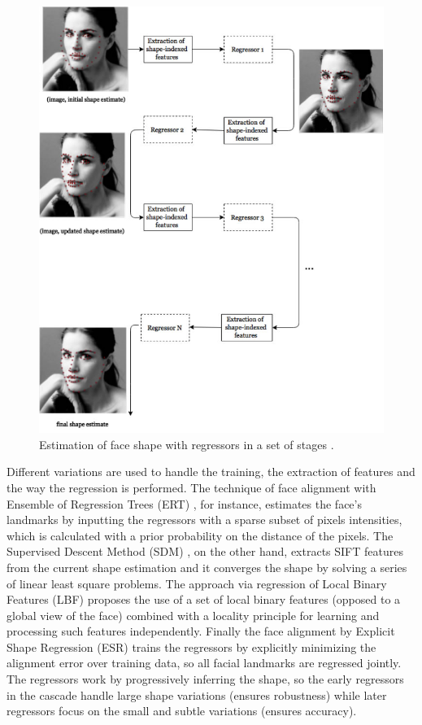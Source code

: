 \begin{figure}[ht]
    \centering
    \includegraphics[width=0.9\linewidth]{figures/cascade-explanation.jpg}
    \caption{Estimation of face shape with regressors in a set of stages \parencite{maris2015}.}
    \label{fig:regressor-steps}
\end{figure}

Different variations are used to handle the training, the extraction of features and the way the regression is performed. The technique of face alignment with Ensemble of Regression Trees (ERT) \parencite{kazemi2014one}, for instance, estimates the face's landmarks by inputting the regressors with a sparse subset of pixels intensities, which is calculated with a prior probability on the distance of the pixels. The Supervised Descent Method (SDM) \parencite{xiong2013supervised}, on the other hand, extracts SIFT features from the current shape estimation and it converges the shape by solving a series of linear least square problems. The approach via regression of Local Binary Features (LBF) \parencite{ren2014face} proposes the use of a set of local binary features (opposed to a global view of the face) combined with a locality principle for learning and processing such features independently. Finally the face alignment by Explicit Shape Regression (ESR) \parencite{cao2014face} trains the regressors by explicitly minimizing the alignment error over training data, so all facial landmarks are regressed jointly. The regressors work by progressively inferring the shape, so the early regressors in the cascade handle large shape variations (ensures robustness) while later regressors focus on the small and subtle variations (ensures accuracy).


